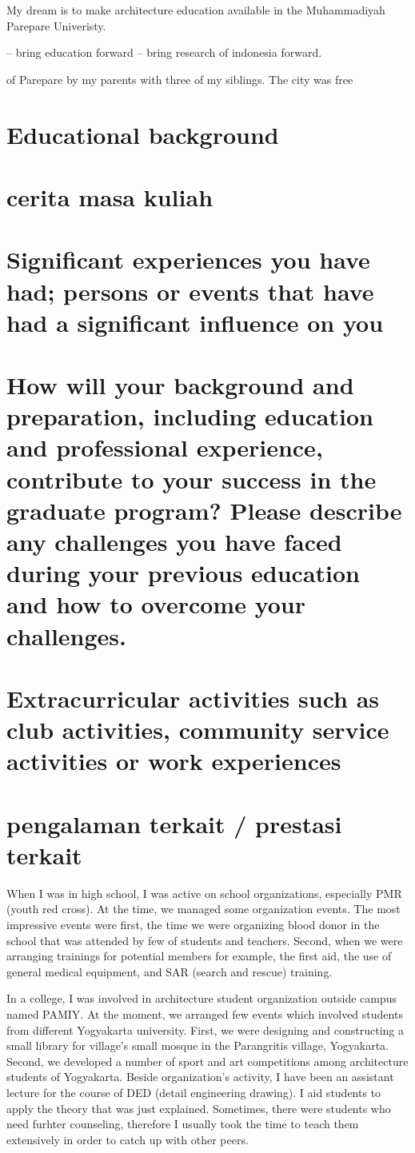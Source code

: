 \documentclass[11pt]{simart} %
\begin{document}
My dream is to make architecture education  available in the Muhammadiyah Parepare Univeristy.


-- bring education forward
-- bring research of indonesia forward.

of Parepare by my parents with three of my siblings.
The city was free

\section{Educational background}
\section*{cerita masa kuliah}

\section{Significant experiences you have had; persons or events that have had a significant influence on you}
\section*{How will your background and preparation, including education and professional experience, contribute to your success in the graduate program? Please describe any challenges you have faced during your previous education and how to overcome your challenges.}

\section{Extracurricular activities such as club activities, community service activities or work experiences}
\section*{pengalaman terkait / prestasi terkait}
When I was in high school, I was active on school organizations, especially PMR (youth red cross). At the time, we managed some organization events. The most impressive events were first, the time we were organizing blood donor in the school that was attended by few of students and teachers. Second, when we were arranging trainings for potential members for example, the first aid, the use of general medical equipment, and SAR (search and rescue) training.

In a college, I was involved in architecture student organization outside campus named PAMIY. At the moment, we arranged few events which involved students from different Yogyakarta university. First, we were designing and constructing a small library for village's small mosque in the Parangritis village, Yogyakarta. Second, we developed a number of sport and art competitions among architecture students of Yogyakarta. Beside organization's activity, I have been an assistant lecture for the course of DED (detail engineering drawing). I aid students to apply the theory that was just explained. Sometimes, there were  students who need furhter counseling, therefore I usually took the time to teach them extensively in order to catch up with other peers.
\end{document}
